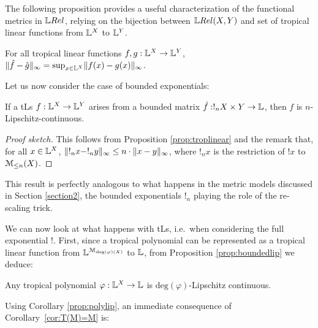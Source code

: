 The following proposition provides a useful characterization of the functional metrics in $\LREL$, relying on 
the bijection between $\HOM{\LREL}{X}{Y}$ and set of tropical linear functions from $\mathbb{L}^{X}$ to $\mathbb{L}^{Y}$.
\begin{proposition}
For all tropical linear functions $f,g:\mathbb{L}^{X}\to \mathbb{L}^{Y}$, $\lVert \hat{f}-\hat{g}\rVert_{\infty} =  \sup_{x\in \mathbb{L}^{X}}
\lVert f( x)-g(x)\rVert_{\infty}$.\end{proposition}

Let us now consider the case of bounded exponentials:
\begin{proposition}\label{prop:boundedlip}
If a tLs $f: \mathbb{L}^{X}\to \mathbb{L}^{Y}$ arises from a bounded matrix $\hat{f}:!_{n}X\times Y\to \mathbb{L}$, then $f$ is $n$-Lipschitz-continuous.
\end{proposition}
\begin{proof}[Proof sketch]
This follows from Proposition \ref{prop:troplinear} and the remark that, for all $x\in \mathbb{L}^{X}$, $\lVert !_{n} x-!_{n} y\rVert_{\infty}\leq n\cdot \lVert x- y\rVert_{\infty}$, where $!_{n} x$ is the restriction of $! x$ to $\mathcal{M}_{\leq n}(X)$.%
\end{proof}
This result is perfectly analogous to what happens in the metric models discussed in Section \ref{section2}, the bounded exponentials $!_{n}$ playing the role of the re-scaling trick.




We can now look at what happens with tLs, i.e.~when considering the full exponential $!$.
First, since a tropical polynomial can be represented as a tropical linear function from $\mathbb{L}^{\mathcal{M}_{\mathrm{deg}(\varphi)(X)}}$ to $\mathbb{L}$, from Proposition \ref{prop:boundedlip} we deduce:
\begin{corollary}\label{prop:polylip}
Any tropical polynomial $\varphi:\mathbb{L}^{X}\to\mathbb{L}$ is $\mathrm{deg}(\varphi)$-Lipschitz continuous.
\end{corollary}


Using Corollary \ref{prop:polylip}, an immediate consequence of %
Corollary~\ref{cor:T(M)=M} is:

